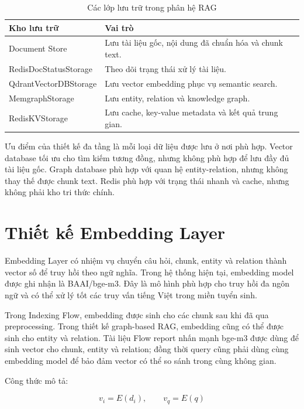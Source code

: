 \documentclass[12pt,a4paper]{report}
\begin{document}
\begin{table}[H]
\centering
\begin{tabular}{|p{4.3cm}|p{8.7cm}|}
\hline
\textbf{Kho lưu trữ} & \textbf{Vai trò} \\
\hline
Document Store & Lưu tài liệu gốc, nội dung đã chuẩn hóa và chunk text. \\
\hline
RedisDocStatusStorage & Theo dõi trạng thái xử lý tài liệu. \\
\hline
QdrantVectorDBStorage & Lưu vector embedding phục vụ semantic search. \\
\hline
MemgraphStorage & Lưu entity, relation và knowledge graph. \\
\hline
RedisKVStorage & Lưu cache, key-value metadata và kết quả trung gian. \\
\hline
\end{tabular}
\caption{Các lớp lưu trữ trong phân hệ RAG}
\label{tab:rag-storage-layers}
\end{table}

Ưu điểm của thiết kế đa tầng là mỗi loại dữ liệu được lưu ở nơi phù hợp. Vector database tối ưu cho tìm kiếm tương đồng, nhưng không phù hợp để lưu đầy đủ tài liệu gốc. Graph database phù hợp với quan hệ entity-relation, nhưng không thay thế được chunk text. Redis phù hợp với trạng thái nhanh và cache, nhưng không phải kho tri thức chính.

\section{Thiết kế Embedding Layer}

Embedding Layer có nhiệm vụ chuyển câu hỏi, chunk, entity và relation thành vector số để truy hồi theo ngữ nghĩa. Trong hệ thống hiện tại, embedding model được ghi nhận là BAAI/bge-m3. Đây là mô hình phù hợp cho truy hồi đa ngôn ngữ và có thể xử lý tốt các truy vấn tiếng Việt trong miền tuyển sinh.

Trong Indexing Flow, embedding được sinh cho các chunk sau khi đã qua preprocessing. Trong thiết kế graph-based RAG, embedding cũng có thể được sinh cho entity và relation. Tài liệu Flow report nhấn mạnh bge-m3 được dùng để sinh vector cho chunk, entity và relation; đồng thời query cũng phải dùng cùng embedding model để bảo đảm vector có thể so sánh trong cùng không gian.

Công thức mô tả:

\begin{equation}
v_i = E(d_i), \qquad v_q = E(q)
\end{equation}
\end{document}
